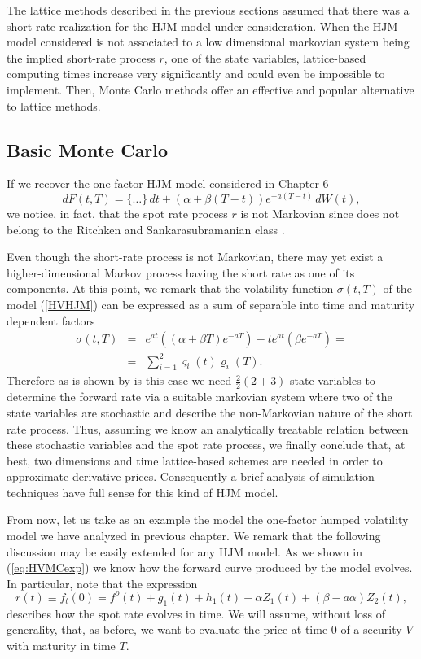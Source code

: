 The lattice methods described in the previous sections assumed that
there was a short-rate realization for the HJM model under
consideration. When the HJM model considered is not associated to a
low dimensional markovian system being the implied short-rate process
$r$, one of the state variables, lattice-based computing times
increase very significantly and could even be impossible to
implement. Then, Monte Carlo methods offer an effective and popular
alternative to lattice methods. 

\subsection{Basic Monte Carlo}
If we recover the one-factor HJM model considered in Chapter 6
\begin{equation}
\label{HVHJM}
dF(t,T)=\{ \dots \}\,dt+ \left( \alpha + \beta (T-t) \right) e^{-a (T-t)}\,dW(t),
\end{equation}
we notice, in fact, that the spot rate process $r$ is not Markovian
since does not belong to the Ritchken and Sankarasubramanian class
\cite{RS:1992}. 

Even though the short-rate process is not Markovian, there may yet
exist a higher-dimensional Markov process having the short rate as one
of its components. At this point, we remark that the volatility
function $\sigma(t,T)$ of the model (\ref{HVHJM}) can be expressed as
a sum of separable into time and maturity dependent factors
\begin{eqnarray}
\nonumber
\sigma(t,T) & = & e^{a t} \left( (\alpha + \beta T) e^{-a T} \right)  -
t e^{a t} \left( \beta e^{-a T} \right)   = \\ 
&= &\sum_{i=1}^2 \varsigma_i(t) \varrho_i(T) .
\end{eqnarray}
Therefore as is shown by \cite[Propos. 1, pp. 4]{Ch:1996} is this case
we need $\frac{2}{2} (2+3)$ state variables to determine the forward
rate via a suitable markovian system where two of the state variables
are stochastic and describe the non-Markovian nature of the short rate
process. Thus, assuming we know an analytically treatable relation
between these stochastic variables and the spot rate process, we
finally conclude that, at best, two dimensions and time lattice-based
schemes are needed in order to approximate derivative
prices. Consequently a brief analysis of simulation techniques have
full sense for this kind of HJM model.

From now, let us take as an example the model the one-factor humped
volatility model we have analyzed in previous chapter. We remark that
the following discussion may be easily extended for any HJM model. As
we shown in (\ref{eq:HVMCexp}) we know how the forward curve produced by
the model evolves. In particular, note that the expression 
\begin{equation}
\label{eq:SRevol}
r(t) \equiv f_t(0) = f^o(t)+ g_1(t) + h_1(t)+\alpha  Z_1(t) + \left(
  \beta -a \alpha \right)  Z_2(t),
\end{equation}
describes how the spot rate evolves in time. We will assume, without
loss of generality, that, as before, we want to evaluate the price at
time $0$ of a security $V$ with maturity in time $T$.

